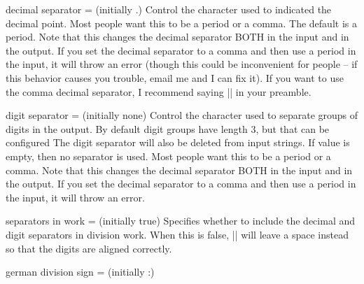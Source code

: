 \documentclass{ltxdoc}
\begin{document}
\begin{key}{decimal separator =  (initially .)}
Control the character used to indicated the decimal point. Most people want this to be a period or a comma. The default is a period. Note that this changes the decimal separator BOTH in the input and in the output. If you set the decimal separator to a comma and then use a period in the input, it will throw an error (though this could be inconvenient for people -- if this behavior causes you trouble, email me and I can fix it).
If you want to use the comma decimal separator, I recommend saying || in your preamble.
\begin{tcblisting}{}
 \quad
{}
\end{tcblisting}
\end{key}

\begin{key}{digit separator =  (initially none)}
Control the character used to separate groups of digits in the output. 
By default digit groups have length 3, but that can be configured 
The digit separator will also be deleted from input strings.
If value is empty, then no separator is used.
Most people want this to be a period or a comma. 
Note that this changes the decimal separator BOTH in the input and in the output. If you set the decimal separator to a comma and then use a period in the input, it will throw an error.
\begin{tcblisting}{}
 \quad
{}
\end{tcblisting}
\end{key}

\begin{key}{}
\begin{tcblisting}{}
 \quad
\end{tcblisting}
\end{key}

\begin{key}{separators in work =  (initially true)}
Specifies whether to include the decimal and digit separators in division work. When this is false, |\longdivision| will leave a space instead so that the digits are aligned correctly. \begin{tcblisting}{}
 \quad
{}
\end{tcblisting}
\end{key}

\begin{key}{german division sign =  (initially :)}
\begin{tcblisting}{}
 \quad
{}
\end{tcblisting}
\end{key}
\end{document}
